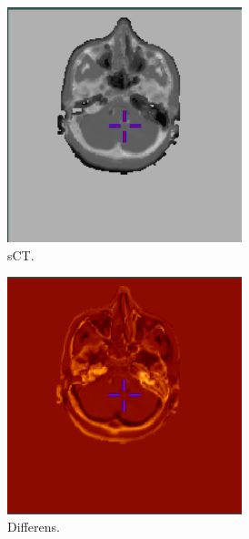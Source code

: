 \begin{figure}[H]
\begin{subfigure}[b]{0.3\textwidth}
        \includegraphics[width=0.75\textwidth]{colager/loocv_ct/loocv_010960_sct.png}
        \caption{sCT.}
        \label{col:loocv_ct_pat4_sct}
    \end{subfigure}\hfill
    \begin{subfigure}[b]{0.3\textwidth}
        \centering
        \includegraphics[width=0.75\textwidth]{colager/loocv_ct/loocv_010960_sub.png}
        \caption{Differens.}
        \label{col:loocv_ct_pat4_sub}
    \end{subfigure}\\
    \begin{subfigure}[b]{0.3\textwidth}
        \centering

\end{subfigure}
\end{figure}
